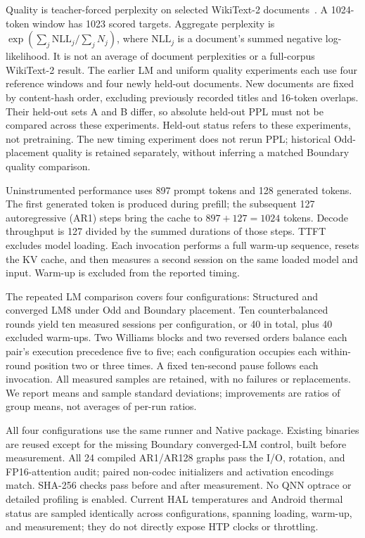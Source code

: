 \documentclass[conference,a4paper,10pt]{IEEEtran}
\begin{document}
Quality is teacher-forced perplexity on selected WikiText-2 documents~\cite{wikitext}. A 1024-token window has 1023 scored targets. Aggregate perplexity is $\exp(\sum_j\mathrm{NLL}_j/\sum_j N_j)$, where $\mathrm{NLL}_j$ is a document's summed negative log-likelihood. It is not an average of document perplexities or a full-corpus WikiText-2 result. The earlier LM and uniform quality experiments each use four reference windows and four newly held-out documents. New documents are fixed by content-hash order, excluding previously recorded titles and 16-token overlaps. Their held-out sets A and B differ, so absolute held-out PPL must not be compared across these experiments. Held-out status refers to these experiments, not pretraining. The new timing experiment does not rerun PPL; historical Odd-placement quality is retained separately, without inferring a matched Boundary quality comparison.

Uninstrumented performance uses 897 prompt tokens and 128 generated tokens. The first generated token is produced during prefill; the subsequent 127 autoregressive (AR1) steps bring the cache to $897+127=1024$ tokens. Decode throughput is 127 divided by the summed durations of those steps. TTFT excludes model loading. Each invocation performs a full warm-up sequence, resets the KV cache, and then measures a second session on the same loaded model and input. Warm-up is excluded from the reported timing.

The repeated LM comparison covers four configurations: Structured and converged LM8 under Odd and Boundary placement. Ten counterbalanced rounds yield ten measured sessions per configuration, or 40 in total, plus 40 excluded warm-ups. Two Williams blocks and two reversed orders balance each pair's execution precedence five to five; each configuration occupies each within-round position two or three times. A fixed ten-second pause follows each invocation. All measured samples are retained, with no failures or replacements. We report means and sample standard deviations; improvements are ratios of group means, not averages of per-run ratios.

All four configurations use the same runner and Native package. Existing binaries are reused except for the missing Boundary converged-LM control, built before measurement. All 24 compiled AR1/AR128 graphs pass the I/O, rotation, and FP16-attention audit; paired non-codec initializers and activation encodings match. SHA-256 checks pass before and after measurement. No QNN optrace or detailed profiling is enabled. Current HAL temperatures and Android thermal status are sampled identically across configurations, spanning loading, warm-up, and measurement; they do not directly expose HTP clocks or throttling.
\end{document}
